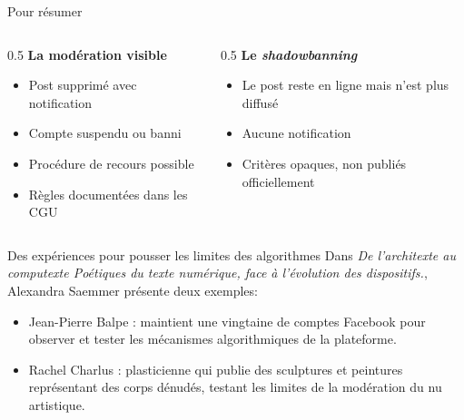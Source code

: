 \begin{frame}{Pour résumer}
    \begin{columns}
        \begin{column}{0.5\textwidth}
            \textbf{La modération visible}
            \centering
            \begin{itemize}
                \item Post supprimé avec notification
                \item Compte suspendu ou banni
                \item Procédure de recours possible
                \item Règles documentées dans les CGU
            \end{itemize}
        \end{column}

        \begin{column}{0.5\textwidth}
            \textbf{Le \textit{shadowbanning}}
            \centering
            \begin{itemize}
                \item Le post reste en ligne mais n'est plus diffusé
                \item Aucune notification 
                \item Critères opaques, non publiés officiellement
            \end{itemize}
            
        \end{column}
    \end{columns}
\end{frame}

\begin{frame}{Des expériences pour pousser les limites des algorithmes}
    Dans \textit{De l’architexte au computexte Poétiques du texte numérique, face à l’évolution des dispositifs.}, Alexandra Saemmer présente deux exemples:
    \begin{itemize}
        \item Jean-Pierre Balpe : maintient une vingtaine de comptes Facebook pour observer et tester les mécanismes algorithmiques de la plateforme.
        \item Rachel Charlus : plasticienne qui publie des sculptures et peintures représentant des corps dénudés, testant les limites de la modération du nu artistique.
    \end{itemize}
\end{frame}
